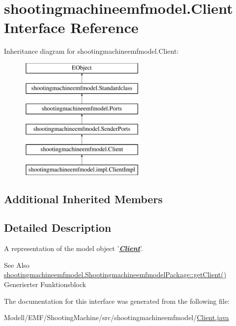 \hypertarget{interfaceshootingmachineemfmodel_1_1_client}{\section{shootingmachineemfmodel.\-Client Interface Reference}
\label{interfaceshootingmachineemfmodel_1_1_client}
}
Inheritance diagram for shootingmachineemfmodel.\-Client\-:\begin{figure}[H]
\begin{center}
\leavevmode
\includegraphics[height=6.000000cm]{interfaceshootingmachineemfmodel_1_1_client}
\end{center}
\end{figure}
\subsection*{Additional Inherited Members}


\subsection{Detailed Description}
A representation of the model object '{\itshape {\bfseries \hyperlink{interfaceshootingmachineemfmodel_1_1_client}{Client}}}'.

\begin{DoxySeeAlso}{See Also}
\hyperlink{interfaceshootingmachineemfmodel_1_1_shootingmachineemfmodel_package_a57e6a0c746b54fe5ea6ef14a72f6af84}{shootingmachineemfmodel.\-Shootingmachineemfmodel\-Package\-::get\-Client()}  Generierter Funktionsblock 
\end{DoxySeeAlso}


The documentation for this interface was generated from the following file\-:\begin{DoxyCompactItemize}
\item 
Modell/\-E\-M\-F/\-Shooting\-Machine/src/shootingmachineemfmodel/\hyperlink{_client_8java}{Client.\-java}\end{DoxyCompactItemize}
